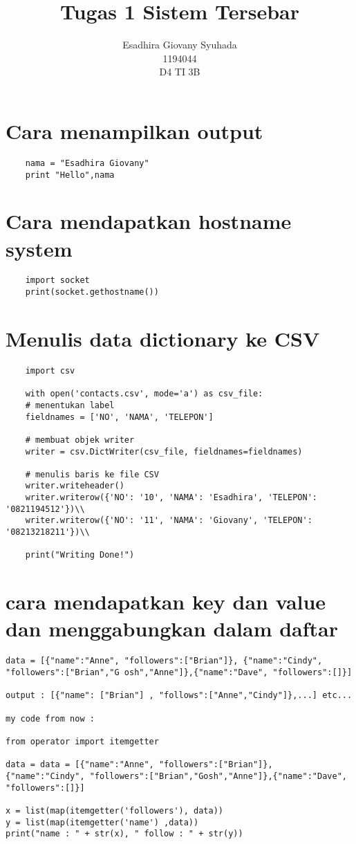 \documentclass[12pt]{article} %
\title{Tugas 1 Sistem Tersebar}
\author{Esadhira Giovany Syuhada \\
1194044 \\
D4 TI 3B}
\begin{document}
\maketitle

\section{Cara menampilkan output}
\begin{lstlisting}
	nama = "Esadhira Giovany"
	print "Hello",nama
\end{lstlisting}

\section {Cara mendapatkan hostname system}
\begin{lstlisting}
	import socket
	print(socket.gethostname())
\end{lstlisting}

\section{ Menulis data dictionary ke CSV}
\begin{sloppypar}
\begin{lstlisting}
	import csv
	
	with open('contacts.csv', mode='a') as csv_file:
	# menentukan label
	fieldnames = ['NO', 'NAMA', 'TELEPON']
	
	# membuat objek writer
	writer = csv.DictWriter(csv_file, fieldnames=fieldnames)
	
	# menulis baris ke file CSV
	writer.writeheader()
	writer.writerow({'NO': '10', 'NAMA': 'Esadhira', 'TELEPON': '0821194512'})\\
	writer.writerow({'NO': '11', 'NAMA': 'Giovany', 'TELEPON': '08213218211'})\\
	
	print("Writing Done!")
\end{lstlisting}
\end{sloppypar}

\section{cara mendapatkan key dan value dan menggabungkan dalam daftar}
\begin{lstlisting}
data = [{"name":"Anne", "followers":["Brian"]}, {"name":"Cindy", "followers":["Brian","G osh","Anne"]},{"name":"Dave", "followers":[]}]

output : [{"name": ["Brian"] , "follows":["Anne","Cindy"]},...] etc...

my code from now :

from operator import itemgetter

data = data = [{"name":"Anne", "followers":["Brian"]}, {"name":"Cindy", "followers":["Brian","Gosh","Anne"]},{"name":"Dave", "followers":[]}]

x = list(map(itemgetter('followers'), data))
y = list(map(itemgetter('name') ,data))
print("name : " + str(x), " follow : " + str(y))
\end{lstlisting}
\end{document}

